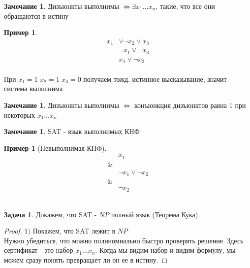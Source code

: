 \documentclass{beamer}
\theoremstyle{plain}
\theoremstyle{definition}
\newtheorem{prob-rus}[thm]{Задача}
\newtheorem{rmk}[thm]{Замечание}
\newtheorem{ex}[thm]{Пример}
\begin{document}
\begin{frame}
	\begin{rmk}
	    Дизъюнкты выполнимы $\Leftrightarrow \exists x_1 \dots x_n$, такие, что все они обращаются в истину
	\end{rmk}
	\begin{ex}
	    \begin{equation*}
	    	\begin{split}
	    		x_1 & \vee \neg x_2 \vee x_3 \\
	    		& \neg x_1 \vee \neg x_3 \\
	    		& x_1 \vee \neg x_2
	    	\end{split}
	    \end{equation*} \\
	    При $x_1=1$ $x_2=1$ $x_3=0$ получаем тожд. истинное высказывание, значит система выполнима
	\end{ex}
\end{frame}

\begin{frame}
	\begin{rmk}
	    Дизъюнкты выполнимы $\Leftrightarrow$ конъюнкция дизъюнктов равна $1$ при некоторых $x_1 \dots x_n$
	\end{rmk}
	\begin{rmk}
	    SAT - язык выполнимых КНФ
	\end{rmk}
	\begin{ex}[Невыполнимая КНФ]
	    \begin{equation*}
	    	\begin{split}
	    		& x_1\\
	    		\& & \\
	    		& \neg x_1 \vee \neg x_2 \\
	    		\& & \\
	    		& \neg x_2
	    	\end{split}
	    \end{equation*} \\
	\end{ex}
\end{frame}

\begin{frame}
	\begin{prob-rus}
	    Докажем, что SAT - $NP$ полный язык	(Теорема Кука)
	\end{prob-rus}
\end{frame}

\begin{frame}
	\begin{proof}
		$1)$ Покажем, что SAT лежит в $NP$ \\
		Нужно убедиться, что можно полиномиально быстро проверять решение. Здесь сертификат - это набор $x_1 \dots x_n$. Когда мы видим набор и видим формулу, мы можем сразу понять превращает ли он ее в истину.
	\end{proof}
\end{frame}
\end{document}
